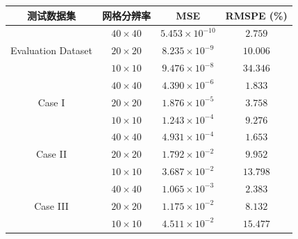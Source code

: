 \begin{table}[!htp]
    \centering
    \begin{tabular}{cccc}
        \toprule
        测试数据集 & 网格分辨率         & MSE                    & RMSPE (\%) \\
        \midrule
        \multirow{3}{*}{Evaluation Dataset}
              & $40\times 40$ & $5.453\times 10^{-10}$ &
        $2.759$                                                     \\
              & $20\times 20$ & $8.235 \times 10^{-9}$ &
        $10.006$                                                    \\
              & $10\times 10$ & $9.476 \times 10^{-8}$ &
        $34.346$                                                    \\
        \midrule
        \multirow{3}{*}{Case I}
              & $40\times 40$ & $4.390 \times 10^{-6}$ &
        $1.833$                                                     \\
              & $20\times 20$ & $1.876 \times 10^{-5}$ &
        $3.758$                                                     \\
              & $10\times 10$ & $1.243 \times 10^{-4}$ &
        $9.276$                                                     \\
        \midrule
        \multirow{3}{*}{Case II}
              & $40\times 40$ & $4.931 \times 10^{-4}$ &
        $1.653$                                                     \\
              & $20\times 20$ & $1.792 \times 10^{-2}$ &
        $9.952$                                                     \\
              & $10\times 10$ & $3.687 \times 10^{-2}$ &
        $13.798$                                                    \\
        \midrule
        \multirow{3}{*}{Case III}
              & $40\times 40$ & $1.065 \times 10^{-3}$ &
        $2.383$                                                     \\
              & $20\times 20$ & $1.175 \times 10^{-2}$ &
        $8.132$                                                     \\
              & $10\times 10$ & $4.511 \times 10^{-2}$ &
        $15.477$                                                    \\
        \bottomrule
    \end{tabular}
    \label{tab:mesh_independence_multiple_testsets}
\end{table}

